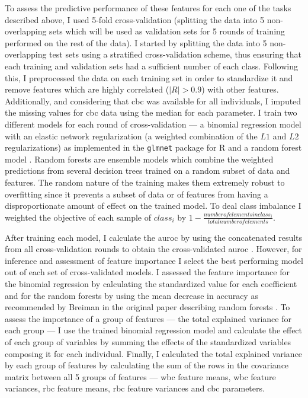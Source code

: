 To assess the predictive performance of these features for each one of the tasks described above, I used 5-fold cross-validation (splitting the data into 5 non-overlapping sets which will be used as validation sets for 5 rounds of training performed on the rest of the data). I started by splitting the data into 5 non-overlapping test sets using a stratified cross-validation scheme, thus ensuring that each training and validation sets had a sufficient number of each class. Following this, I preprocessed the data on each training set in order to standardize it and remove features which are highly correlated ($|R|>0.9$) with other features. Additionally, and considering that \ac{cbc} was available for all individuals, I imputed the missing values for \ac{cbc} data using the median for each parameter. I train two different models for each round of cross-validation --- a binomial regression model with an elastic network regularization (a weighted combination of the $L1$ and $L2$ regularizations) as implemented in the \texttt{glmnet} package for R \cite{Friedman2010-gl} and a random forest model \cite{Breiman2001-yz}. Random forests are ensemble models which combine the weighted predictions from several decision trees trained on a random subset of data and features. The random nature of the training makes them extremely robust to overfitting since it prevents a subset of data or of features from having a disproportionate amount of effect on the trained model. To deal class imbalance I weighted the objective of each sample of $class_i$ by $1-\frac{number of elements in class_i}{total number of elements}$. 

After training each model, I calculate the \ac{auroc} by using the concatenated results from all cross-validation rounds to obtain the cross-validated \ac{auroc} \cite{Fawcett2006-mo}. However, for inference and assessment of feature importance I select the best performing model out of each set of cross-validated models. I assessed the feature importance for the binomial regression by calculating the standardized value for each coefficient and for the random forests by using the mean decrease in accuracy as recommended by Breiman in the original paper describing random forests \cite{Breiman2001-yz}. To assess the importance of a group of features --- the total explained variance for each group --- I use the trained binomial regression model and calculate the effect of each group of variables by summing the effects of the standardized variables composing it for each individual. Finally, I calculated the total explained variance by each group of features by calculating the sum of the rows in the covariance matrix between all 5 groups of features --- \ac{wbc} feature means, \ac{wbc} feature variances, \ac{rbc} feature means, \ac{rbc} feature variances and \ac{cbc} parameters.

